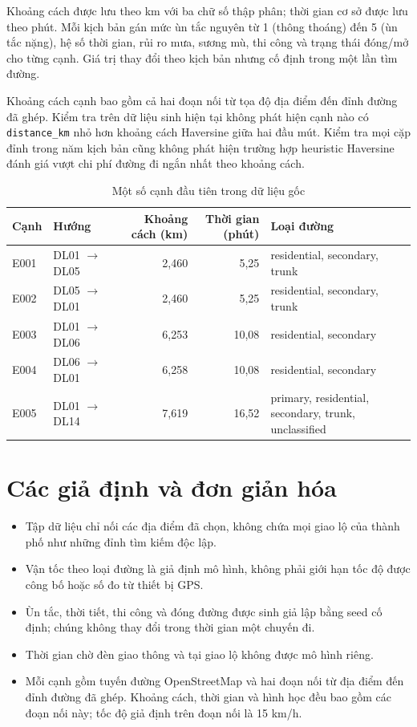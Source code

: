 Khoảng cách được lưu theo km với ba chữ số thập phân; thời gian cơ sở được lưu
theo phút. Mỗi kịch bản gán mức ùn tắc nguyên từ 1 (thông thoáng) đến 5 (ùn tắc
nặng), hệ số thời gian, rủi ro mưa, sương mù, thi công và trạng thái đóng/mở cho
từng cạnh. Giá trị thay đổi theo kịch bản nhưng cố định trong một lần tìm đường.

Khoảng cách cạnh bao gồm cả hai đoạn nối từ tọa độ địa điểm đến đỉnh đường đã
ghép. Kiểm tra trên dữ liệu sinh hiện tại không phát hiện cạnh nào có
\texttt{distance\_km} nhỏ hơn khoảng cách Haversine giữa hai đầu mút. Kiểm tra
mọi cặp đỉnh trong năm kịch bản cũng không phát hiện trường hợp heuristic
Haversine đánh giá vượt chi phí đường đi ngắn nhất theo khoảng cách.

\begin{table}[h!]
\centering
\caption{Một số cạnh đầu tiên trong dữ liệu gốc}
\small
\begin{tabular}{p{1.1cm}p{2.6cm}rrp{4.4cm}}
\toprule
Cạnh & Hướng & Khoảng cách (km) & Thời gian (phút) & Loại đường \\
\midrule
E001 & DL01 $\rightarrow$ DL05 & 2,460 & 5,25 & residential, secondary, trunk \\
E002 & DL05 $\rightarrow$ DL01 & 2,460 & 5,25 & residential, secondary, trunk \\
E003 & DL01 $\rightarrow$ DL06 & 6,253 & 10,08 & residential, secondary \\
E004 & DL06 $\rightarrow$ DL01 & 6,258 & 10,08 & residential, secondary \\
E005 & DL01 $\rightarrow$ DL14 & 7,619 & 16,52 & primary, residential, secondary, trunk, unclassified \\
\bottomrule
\end{tabular}
\end{table}

\section{Các giả định và đơn giản hóa}

\begin{itemize}[itemsep=2pt]
  \item Tập dữ liệu chỉ nối các địa điểm đã chọn, không chứa mọi giao lộ của thành
  phố như những đỉnh tìm kiếm độc lập.
  \item Vận tốc theo loại đường là giả định mô hình, không phải giới hạn tốc độ
  được công bố hoặc số đo từ thiết bị GPS.
  \item Ùn tắc, thời tiết, thi công và đóng đường được sinh giả lập bằng seed cố
  định; chúng không thay đổi trong thời gian một chuyến đi.
  \item Thời gian chờ đèn giao thông và tại giao lộ không được mô hình riêng.
  \item Mỗi cạnh gồm tuyến đường OpenStreetMap và hai đoạn nối từ địa điểm đến
  đỉnh đường đã ghép. Khoảng cách, thời gian và hình học đều bao gồm các đoạn
  nối này; tốc độ giả định trên đoạn nối là 15 km/h.
\end{itemize}
